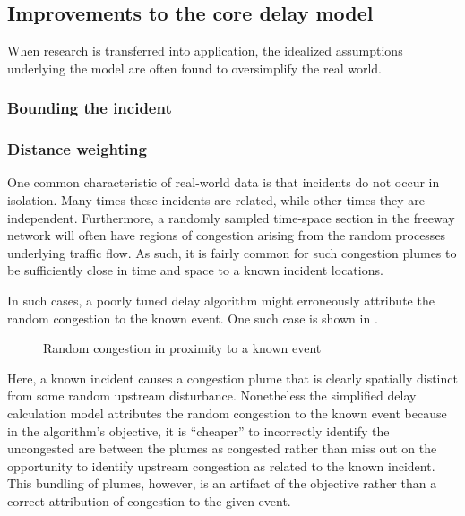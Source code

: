 \documentclass[12pt]{report}
\newcommand{\inputTikZ}[1]{%
  }
\newcommand{\inputTikZ}[1]{%
    \beginpgfgraphicnamed{#1-external}%
    \endpgfgraphicnamed%
  }
\begin{document}
\subsection{Improvements to the core delay model}
\label{sec:delay-improvements}

When research is transferred into application, the idealized assumptions
underlying the model are often found to oversimplify the real world.  

\subsubsection{Bounding the incident}
\label{sec:incident-bounds}


\subsubsection{Distance weighting}
\label{sec:dist-weight}

One common characteristic of real-world data is that incidents do not occur in
isolation.  Many times these incidents are related, while other times they are
independent.  Furthermore, a randomly sampled time-space section in the freeway
network will often have regions of congestion arising from the random processes
underlying traffic flow.  As such, it is fairly common for such congestion
plumes to be sufficiently close in time and space to a known incident locations.

In such cases, a poorly tuned delay algorithm might erroneously attribute the
random congestion to the known event.  One such case is shown in
.
\begin{figure}[t]
  \begin{center}
    \caption[Random congestion in proximity to a known event]{Random congestion in proximity to a known event}
    \label{fig:time-space-random-versus-known}
  \end{center}
\end{figure}
Here, a known incident causes a congestion plume that is clearly spatially
distinct from some random upstream disturbance.  Nonetheless the simplified
delay calculation model attributes the random congestion to the known event
because in the algorithm's objective, it is ``cheaper'' to incorrectly identify
the uncongested are between the plumes as congested rather than miss out on the
opportunity to identify upstream congestion as related to the known incident.
This bundling of plumes, however, is an artifact of the objective rather than a
correct attribution of congestion to the given event.
\end{document}
